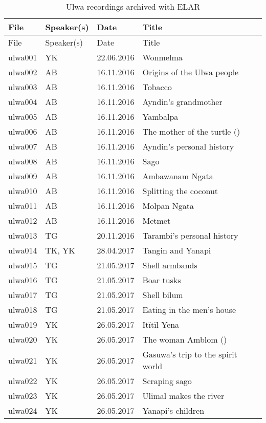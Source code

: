 \begin{xltabular}{\textwidth}{lllQ}
\caption{\label{tab:E.1} Ulwa recordings archived with ELAR}\\
\lsptoprule
		File & Speaker(s) & Date & Title\\
		\midrule\endfirsthead
    \midrule
    File & Speaker(s) & Date & Title\\
		\midrule\endhead
    \midrule\endfoot
    \lspbottomrule
    \endlastfoot

ulwa001 & YK & 22.06.2016 & Wonmelma\\
ulwa002 & AB & 16.11.2016 & Origins of the Ulwa people\\
ulwa003 & AB & 16.11.2016 & Tobacco\\
ulwa004 & AB & 16.11.2016 & Ayndin’s grandmother\\
ulwa005 & AB & 16.11.2016 & Yambalpa\\
ulwa006 & AB & 16.11.2016 & The mother of the turtle ()\\
ulwa007 & AB & 16.11.2016 & Ayndin’s personal history\\
ulwa008 & AB & 16.11.2016 & Sago\\
ulwa009 & AB & 16.11.2016 & Ambawanam Ngata\\
ulwa010 & AB & 16.11.2016 & Splitting the coconut\\
ulwa011 & AB & 16.11.2016 & Molpan Ngata\\
ulwa012 & AB & 16.11.2016 & Metmet\\
ulwa013 & TG & 20.11.2016 & Tarambi’s personal history\\
ulwa014 & TK, YK & 28.04.2017 & Tangin and Yanapi\\
ulwa015 & TG & 21.05.2017 & Shell armbands\\
ulwa016 & TG & 21.05.2017 & Boar tusks\\
ulwa017 & TG & 21.05.2017 & Shell bilum\\
ulwa018 & TG & 21.05.2017 & Eating in the men’s house\\
ulwa019 & YK & 26.05.2017 & Itïtïl Yena\\
ulwa020 & YK & 26.05.2017 & The woman Amblom ()\\
ulwa021 & YK & 26.05.2017 & Gasuwa’s trip to the spirit world\\
ulwa022 & YK & 26.05.2017 & Scraping sago\\
ulwa023 & YK & 26.05.2017 & Ulimal makes the river\\
ulwa024 & YK & 26.05.2017 & Yanapi’s children\\

\end{xltabular}
